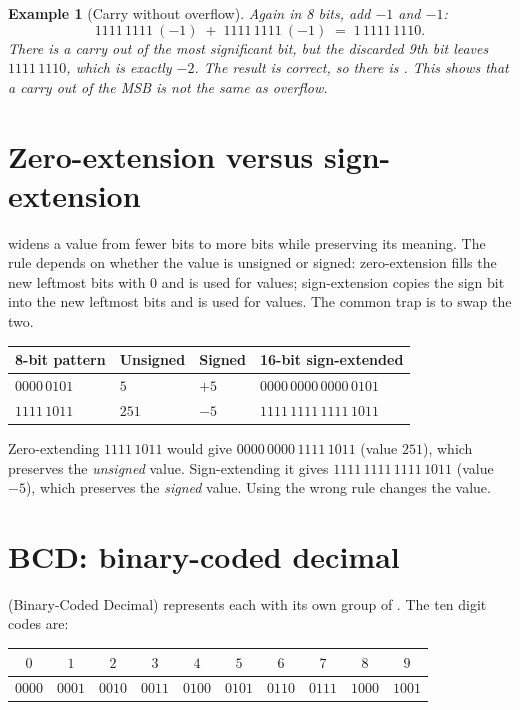 \documentclass[11pt]{article}
\newtheorem{example}{Example}[section]
\begin{document}
\begin{example}[Carry without overflow]
Again in 8 bits, add $-1$ and $-1$:
\[
1111\,1111\ (-\!1) \;+\; 1111\,1111\ (-\!1) \;=\; 1\,1111\,1110.
\]
There is a carry out of the most significant bit, but the discarded 9th bit
leaves $1111\,1110$, which is exactly $-2$. The result is correct, so there is
. This shows that a carry out of the MSB is not the same as
overflow.
\end{example}

\section{Zero-extension versus sign-extension}
 widens a value from fewer bits to more bits while preserving
its meaning. The rule depends on whether the value is unsigned or signed:
zero-extension fills the new leftmost bits with 0 and is used for
 values; sign-extension copies the sign bit into the new
leftmost bits and is used for  values. The common trap is to swap
the two.

\begin{center}
\begin{tabular}{llll}
\toprule
\textbf{8-bit pattern} & \textbf{Unsigned} & \textbf{Signed} & \textbf{16-bit sign-extended} \\
\midrule
$0000\,0101$ & $5$ & $+5$ & $0000\,0000\,0000\,0101$ \\
$1111\,1011$ & $251$ & $-5$ & $1111\,1111\,1111\,1011$ \\
\bottomrule
\end{tabular}
\end{center}

Zero-extending $1111\,1011$ would give $0000\,0000\,1111\,1011$ (value $251$),
which preserves the \emph{unsigned} value. Sign-extending it gives
$1111\,1111\,1111\,1011$ (value $-5$), which preserves the \emph{signed}
value. Using the wrong rule changes the value.

\section{BCD: binary-coded decimal}
 (Binary-Coded Decimal) represents each  with its
own group of . The ten digit codes are:

\begin{center}
\begin{tabular}{cccccccccc}
\toprule
$0$ & $1$ & $2$ & $3$ & $4$ & $5$ & $6$ & $7$ & $8$ & $9$ \\
\midrule
$0000$ & $0001$ & $0010$ & $0011$ & $0100$ & $0101$ & $0110$ & $0111$ & $1000$ & $1001$ \\
\bottomrule
\end{tabular}
\end{center}
\end{document}
